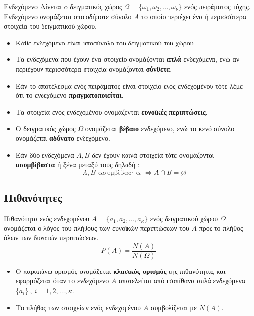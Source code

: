 \begin{orismos}{Ενδεχόμενο}
Δίνεται o δειγματικός χώρος $ \varOmega=\{\omega_1,\omega_2,\ldots,\omega_{\nu}\} $ ενός πειράματος τύχης. Ενδεχόμενο ονομάζεται οποιοδήποτε σύνολο $A$ το οποίο περιέχει ένα ή περισσότερα στοιχεία του δειγματικού χώρου.
\begin{itemize}[itemsep=0mm]
\item Κάθε ενδεχόμενο είναι υποσύνολο του δειγματικού του χώρου.
\item Τα ενδεχόμενα που έχουν ένα στοιχείο ονομάζονται \textbf{απλά} ενδεχόμενα, ενώ αν περιέχουν περισσότερα στοιχεία ονομάζονται \textbf{σύνθετα}.
\item Εάν το αποτέλεσμα ενός πειράματος είναι στοιχείο ενός ενδεχομένου τότε λέμε ότι το ενδεχόμενο \textbf{πραγματοποιείται}.
\item Τα στοιχεία ενός ενδεχομένου ονομάζονται \textbf{ευνοϊκές περιπτώσεις}.
\item Ο δειγματικός χώρος $ \varOmega $ ονομάζεται \textbf{βέβαιο} ενδεχόμενο, ενώ το κενό σύνολο ονομάζεται \textbf{αδύνατο} ενδεχόμενο.
\item Εάν δύο ενδεχόμενα $ A,B $ δεν έχουν κοινά στοιχεία τότε ονομάζονται \textbf{ασυμβίβαστα} ή ξένα μεταξύ τους δηλαδή : 
\[ A,B \textrm{ ασυμβίβαστα }\Leftrightarrow A\cap B=\varnothing \]
\end{itemize}
\end{orismos}

\subsection{Πιθανότητες}
Πιθανότητα ενός ενδεχομένου $ A=\{a_1,a_2,\ldots,a_\kappa\} $ ενός δειγματικού χώρου $ \varOmega $ ονομάζεται ο λόγος του πλήθους των ευνοϊκών περιπτώσεων του $ A $ προς το πλήθος όλων των δυνατών περιπτώσεων.
\[ P(A)=\frac{N(A)}{N(\varOmega)} \]
\begin{itemize}[itemsep=0mm]
\item Ο παραπάνω ορισμός ονομάζεται \textbf{κλασικός ορισμός} της πιθανότητας και εφαρμόζεται όταν το ενδεχόμενο $ A $ αποτελείται από ισοπίθανα απλά ενδεχόμενα $ \{a_i\}\ ,\ i=1,2,\ldots,\kappa $.
\item Το πλήθος των στοιχείων ενός ενδεχομένου $ A $ συμβολίζεται με $ N(A) $.
\end{itemize}

